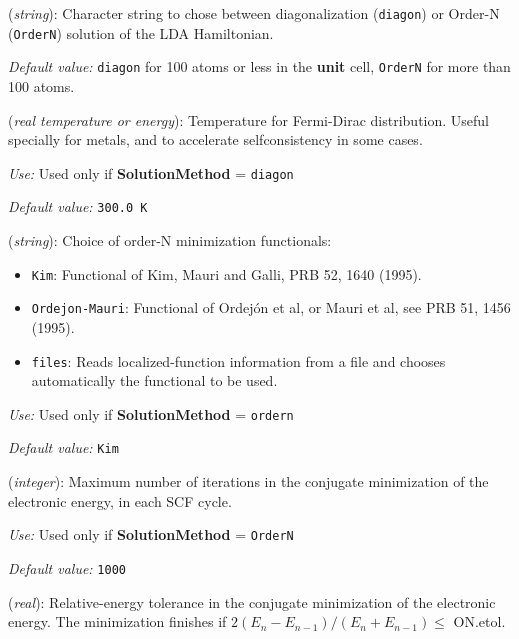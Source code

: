 \begin{description}
\itemsep 10pt
\parsep 0pt

\item[{\bf SolutionMethod}] ({\it string}): 
Character string to chose between
diagonalization ({\tt diagon}) or Order-N ({\tt OrderN}) solution
of the LDA Hamiltonian.

{\it Default value:} {\tt diagon} for 100 atoms or less in the 
{\bf unit} cell, {\tt OrderN} for more than 100 atoms.

\item[{\bf ElectronicTemperature}] ({\it real temperature or energy}): 
Temperature for Fermi-Dirac distribution. Useful specially for
metals, and to accelerate selfconsistency in some cases.

{\it Use:} Used only if {\bf SolutionMethod} = {\tt diagon}

{\it Default value:} {\tt 300.0 K}


\item[{\bf ON.functional}] ({\it string}): 
Choice of order-N minimization functionals: 
\begin{itemize}
\item {\tt Kim}: 
Functional of Kim, Mauri and Galli, PRB 52, 1640 (1995).
\item {\tt Ordejon-Mauri}: 
Functional of Ordej\'on et al, or Mauri et al, see PRB 51, 1456 (1995).
\item {\tt files}: 
Reads localized-function information from a file and 
chooses automatically the functional to be used. 
\end{itemize}

{\it Use:} Used only if {\bf SolutionMethod} = {\tt ordern}

{\it Default value:} {\tt Kim}

\item[{\bf ON.MaxNumIter}] ({\it integer}): 
Maximum number of iterations
in the conjugate minimization of the electronic
energy, in each SCF cycle.

{\it Use:} Used only if {\bf SolutionMethod} = {\tt OrderN}

{\it Default value:} {\tt 1000}

\item[{\bf ON.etol}] ({\it real}): 
Relative-energy tolerance in the conjugate minimization of the electronic
energy. The minimization finishes if 
\hspace{0.2truecm} $2 (E_n - E_{n-1}) / (E_n + E_{n-1}) \leq $ ON.etol.


\end{description}
